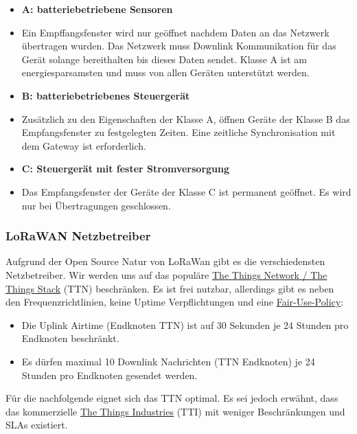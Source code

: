 \documentclass[12pt]{article}
\begin{document}
        \begin{itemize}
          \item \textbf{A: batteriebetriebene Sensoren}
          \item[] Ein Empffangsfenster wird nur geöffnet nachdem Daten an das Netzwerk übertragen wurden. Das Netzwerk muss Downlink Kommunikation
            für das Gerät solange bereithalten bis dieses Daten sendet. Klasse A ist am energiesparsamsten und muss von allen Geräten unterstützt werden.
          \item \textbf{B: batteriebetriebenes Steuergerät}
          \item[] Zusätzlich zu den Eigenschaften der Klasse A, öffnen Geräte der Klasse B das Empfangsfenster zu festgelegten Zeiten. Eine zeitliche Synchronisation mit dem Gateway ist erforderlich.
          \item \textbf{C: Steuergerät mit fester Stromversorgung}
          \item[] Das Empfangsfenster der Geräte der Klasse C ist permanent geöffnet. Es wird nur bei Übertragungen geschlossen.
        \end{itemize}

      

      \subsubsection{LoRaWAN Netzbetreiber} \label{subsec:LoRaWAN Netzbetreiber}
        Aufgrund der Open Source Natur von LoRaWan gibt es die verschiedensten Netzbetreiber. Wir werden uns auf das populäre
        \href{https://www.thethingsnetwork.org/}{The Things Network / The Things Stack} (TTN) beschränken.
        Es ist frei nutzbar, allerdings gibt es neben den Frequenzrichtlinien, keine Uptime Verpflichtungen und eine \href{https://www.thethingsnetwork.org/docs/lorawan/duty-cycle/}{Fair-Use-Policy}:

        \begin{itemize}
          \item Die Uplink Airtime (Endknoten \textrightarrow{} TTN) ist auf 30 Sekunden je 24 Stunden pro Endknoten beschränkt.
          \item Es dürfen maximal 10 Downlink Nachrichten (TTN \textrightarrow{} Endknoten) je 24 Stunden pro Endknoten gesendet werden.
        \end{itemize}
        
        Für die nachfolgende \underline{} eignet sich das TTN optimal. Es sei jedoch erwähnt, dass das kommerzielle \href{https://www.thethingsindustries.com/}{The Things Industries} (TTI) mit weniger Beschränkungen und SLAs existiert.
         
\end{document}
